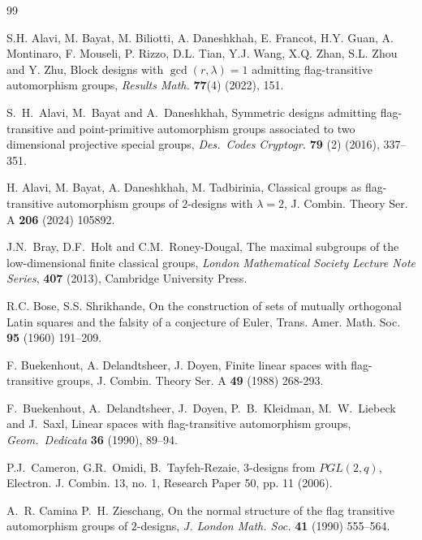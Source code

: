 \documentclass[a4paper,twopage,reqno,12pt]{amsart}
\theoremstyle{definition}
\numberwithin{equation}{section}
\begin{document}
\begin{thebibliography}{99}

S.H. Alavi, M. Bayat, M. Biliotti, A. Daneshkhah, E. Francot, H.Y. Guan, 
A. Montinaro, F. Mouseli, P. Rizzo, D.L. Tian, Y.J. Wang, X.Q. Zhan, S.L. Zhou and Y. Zhu,
Block designs with $\gcd(r,\lambda )= 1$ admitting flag-transitive automorphism groups,
\emph{Results Math.} \textbf{77}(4) (2022), 151. 

S.~H.~Alavi, M.~Bayat and A.~Daneshkhah,
Symmetric designs admitting flag-transitive and point-primitive automorphism
groups associated to two dimensional projective special groups,
\emph{Des.\ Codes Cryptogr.} \textbf{79} (2) (2016), 337--351.

 H. Alavi, M. Bayat, A. Daneshkhah, M. Tadbirinia, Classical groups as flag-transitive automorphism groups of $2$-designs with $\lambda=2$, J. Combin. Theory Ser. A \textbf{206} (2024) 105892.

J.N.~Bray, D.F.~Holt and C.M.~Roney-Dougal,
The maximal subgroups of the low-dimensional finite classical groups,
\emph{London Mathematical Society Lecture Note Series},
\textbf{407} (2013), Cambridge University Press.

 R.C. Bose, S.S. Shrikhande, On the construction of sets of mutually orthogonal Latin squares and the falsity of a conjecture of Euler, Trans. Amer. Math. Soc. \textbf{95} (1960) 191--209. 

 F. Buekenhout, A. Delandtsheer, J. Doyen, Finite linear spaces with flag-transitive groups, J. Combin. Theory Ser. A \textbf{49} (1988) 268-293.

F.~Buekenhout, A.~Delandtsheer, J.~Doyen, P.~B.~Kleidman, M.~W.~Liebeck and J.~Saxl, Linear spaces with flag-transitive automorphism groups,
\emph{Geom.\ Dedicata} \textbf{36} (1990), 89--94.


 P.J.~Cameron, G.R.~Omidi, B.~Tayfeh-Rezaie, $3$-designs from $PGL(2,q)$, Electron. J. Combin. 13, no. 1, Research Paper 50, pp. 11 (2006).

A.~R. Camina P.~H. Zieschang, On the normal structure of the flag transitive automorphism groups of $2$-designs, 
\emph{J. London Math. Soc.} \textbf{41} (1990) 555--564.



\end{thebibliography}
\end{document}
